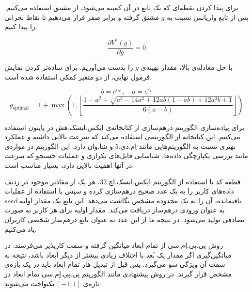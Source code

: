 برای پیدا کردن نقطه‌ای که یک تابع در آن کمینه می‌شود، از مشتق استفاده می‌کنیم. پس از تابع واریانس نسبت به $g$ مشتق گرفته و برابر صفر قرار می‌دهیم تا نقاط بحرانی را پیدا کنیم.

$$\frac{\partial V^*(g)}{\partial g} = 0$$

با حل معادله‌ی بالا، مقدار بهینه‌ی $g$ را بدست می‌آوریم. برای ساده‌تر کردن نمایش فرمول نهایی، از دو متغیر کمکی استفاده شده است.

$$b = e^{\epsilon_\infty}, \quad a = e^{\epsilon_1}$$
\begin{equation}
g_{\text{optimal}} = 1 + \max\left(1, \left\lfloor \frac{1-a^2+\sqrt{a^4-14a^2+12ab(1-ab)+12a^3b+1}}{6(a-b)} \right\rfloor \right)
\end{equation}

برای پیاده‌سازی الگوریتم درهم‌سازی از کتابخانه‌ی ایکس.ایسک.هش  در پایتون استفاده می‌کنیم. این کتابخانه از الگوریتمی استفاده می‌کند که سرعت بالایی داشته و عملکرد بهتری نسبت به الگوریتم‌هایی مانند اِم.دی.5 و شا.وان دارد. این الگوریتم در مواردی مانند بررسی یکپارچگی داده‌ها، شناسایی فایل‌های تکراری و عملیات جستجو که سرعت در آنها اهمیت بالایی دارد، بسیار مناسب است.

قطعه کد  با استفاده از الگوریتم ایکس.ایسک.اچ.32، هر یک از مقادیر موجود در ردیف داده‌های کاربر را به یک عدد صحیح درهم‌سازی کرده و سپس با استفاده از عملیات باقیمانده، آن را به یک محدوده مشخص نگاشت می‌دهد. این تابع یک مقدار اولیه $seed$ به عنوان ورودی درهم‌ساز دریافت می‌کند. مقدار اولیه برای هر کاربر به صورت تصادفی تولید می‌شود. در نتیجه ما از این عدد به عنوان تابع درهم‌ساز شخصی کاربران یاد می‌کنیم.



روش پی.پی.اِم.سی از تمام ابعاد میانگین گرفته و سمت کارپذیر می‌فرستد. در میانگین‌گیری اگر مقدار یک بُعد با اختلاف زیادی بیشتر از دیگر ابعاد باشد، نتیجه به سمت آن ویژگی سو می‌گیرد. پس قبل از تبدیل هار تمام ابعاد باید در یک بازه‌ی مشخص قرار گیرند. در روش پیشنهادی مانند الگوریتم پی.پی.اِم.سی تمام ابعاد در بازه‌ی $[-1, 1]$ یکنواخت می‌شوند.

